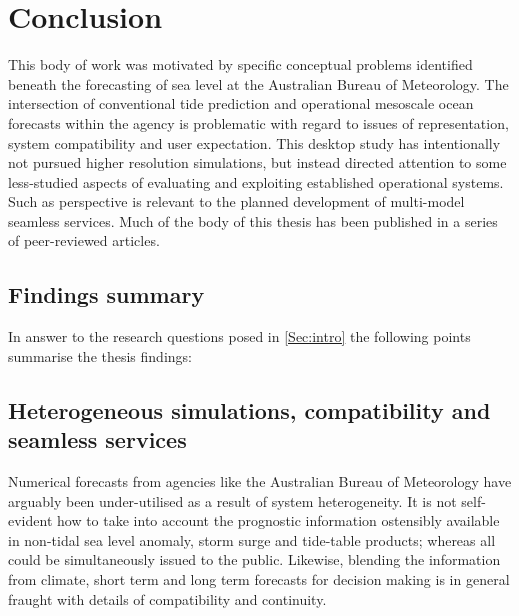 \chapter{Conclusion}
\label{chp:conclusions}

This body of work was motivated by specific conceptual problems identified beneath the forecasting of sea level at the Australian Bureau of Meteorology.  The intersection of conventional tide prediction and operational mesoscale ocean forecasts within the agency is problematic with regard to issues of representation, system compatibility and user expectation.
This desktop study has intentionally not pursued higher resolution simulations, but instead directed attention to some less-studied aspects of evaluating and exploiting established operational systems.   Such as perspective is relevant to the planned development of multi-model seamless services.   
Much of the body of this thesis has been published in a series of peer-reviewed articles.
\section{Findings summary}
In answer to the research questions posed in \ref{Sec:intro} the following points summarise the thesis findings:


\section{Heterogeneous simulations, compatibility and seamless services}

Numerical forecasts from agencies like the Australian Bureau of Meteorology have arguably been under-utilised as a result of system heterogeneity.   It is not self-evident how to take into account the prognostic information ostensibly available in non-tidal sea level anomaly, storm surge and tide-table products; whereas all could be simultaneously issued to the public. 
Likewise, blending the information from climate, short term and long term forecasts for decision making is in general fraught with details of compatibility and continuity.

